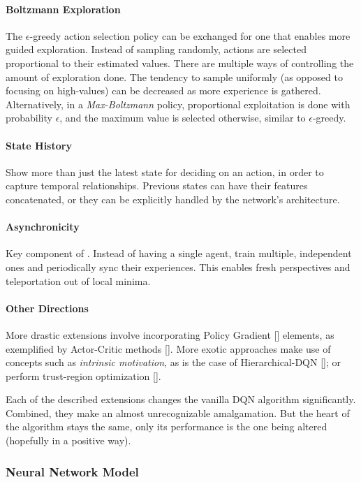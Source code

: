 \documentclass{article}
\begin{document}
\paragraph{Boltzmann Exploration} The  $\epsilon$-greedy action selection policy can be exchanged for one that enables more guided exploration. Instead of sampling randomly, actions are selected proportional to their estimated values. There are multiple ways of controlling the amount of exploration done. The tendency to sample uniformly (as opposed to focusing on high-values) can be decreased as more experience is gathered. Alternatively, in a \textit{Max-Boltzmann} policy, proportional exploitation is done with probability $\epsilon$, and the maximum value is selected otherwise, similar to $\epsilon$-greedy.

\paragraph{State History} Show more than just the latest state for deciding on an action, in order to capture temporal relationships. Previous states can have their features concatenated, or they can be explicitly handled by the network's architecture.

\paragraph{Asynchronicity} Key component of \cite{es}. Instead of having a single agent, train multiple, independent ones and periodically sync their experiences. This enables fresh perspectives and teleportation out of local minima.

\paragraph{Other Directions} More drastic extensions involve incorporating Policy Gradient [\cite{sutton}] elements, as exemplified by Actor-Critic methods [\cite{a3c}]. More exotic approaches make use of concepts such as \textit{intrinsic motivation}, as is the case of Hierarchical-DQN [\cite{hier}]; or perform trust-region optimization [\cite{trpo}].

Each of the described extensions changes the vanilla DQN algorithm significantly. Combined, they make an almost unrecognizable amalgamation. But the heart of the algorithm stays the same, only its performance is the one being altered (hopefully in a positive way).


\subsubsection{Neural Network Model}
\end{document}

